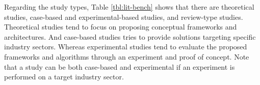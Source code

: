 Regarding the study types, Table \ref{tbl:lit-bench} shows that there are theoretical studies, case-based and experimental-based studies, and review-type studies. Theoretical studies tend to focus on proposing conceptual frameworks and architectures. And case-based studies tries to provide solutions targeting specific industry sectors. Whereas experimental studies tend to evaluate the proposed frameworks and algorithms through an experiment and proof of concept. Note that a study can be both case-based and experimental if an experiment is performed on a target industry sector. 



   
    

